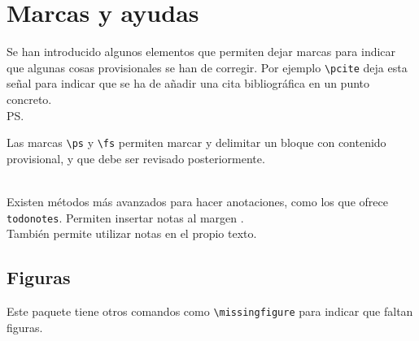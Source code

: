 \chapter{Marcas y ayudas}

Se han introducido algunos elementos que permiten dejar marcas para indicar que algunas cosas provisionales se han de corregir. Por ejemplo \verb+\pcite+ deja esta señal \pcite para indicar que se ha de añadir una cita bibliográfica en un punto concreto. \\

\ps

Las marcas \verb+\ps+ y \verb+\fs+ permiten marcar y delimitar un bloque con contenido provisional, y que debe ser revisado posteriormente.

\fs \\


Existen métodos más avanzados para hacer anotaciones, como los que ofrece \verb+todonotes+. Permiten insertar notas al margen .  \\

También  permite utilizar notas en el propio texto.    


\section{Figuras}

Este paquete tiene otros comandos como \verb+\missingfigure+ para indicar que faltan figuras. \\

